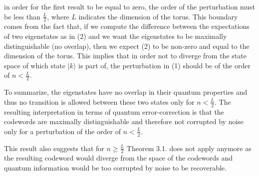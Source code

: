 \documentclass[12pt]{report}
\begin{document}
\begin{minipage}{1 \textwidth}
		in order for the first result to be equal to zero, the order of the perturbation must be less than $ \frac{L}{2}$, where $L$ indicates the dimension of the torus. 
		This boundary comes from the fact that, if we compute the difference between the expectations of two eigenstates as in (2) and we want the eigenstates to be maximally distinguishable (no overlap), then we expect (2) to be non-zero and equal to the dimension of the torus. 
		This implies that in order not to diverge from the state space of which state $| k \rangle$  is part of, the perturbation in (1) should be of the order of $n < \frac{L}{2}$. \newline
		
		
				
		To summarize, the eigenstates have no overlap in their quantum properties and thus no transition is allowed between these two states only for $n < \frac{L}{2}$. \newline
		The resulting interpretation in terms of quantum error-correction is that the codewords are maximally distinguishable and therefore not corrupted by noise only for a perturbation of the order of $n < \frac{L}{2}$. \newline
		
		This result also suggests that for $n \geq \frac{L}{2}$ Theorem 3.1. does not apply anymore as the resulting codeword would diverge from the space of the codewords and quantum information would be too corrupted by noise to be recoverable.
		\newline
		
		
		

		
	\end{minipage}
	
\end{document}
